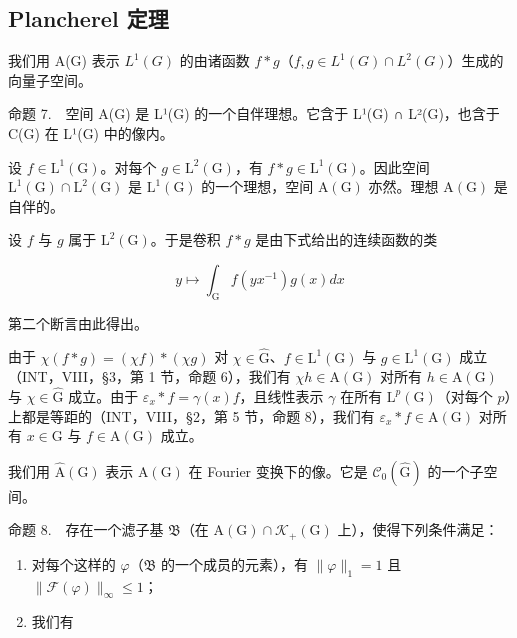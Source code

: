 \subsection{Plancherel 定理}

我们用 A(G) 表示 \(L^{1}(G)\) 的由诸函数 \(f * g\)（\(f, g \in L^{1}(G) \cap L^{2}(G)\)）生成的向量子空间。

命题 7.　空间 A(G) 是 L¹(G) 的一个自伴理想。它含于 L¹(G) ∩ L²(G)，也含于 C(G) 在 L¹(G) 中的像内。

设 \(f \in \mathrm{L}^1(\mathrm{G})\)。对每个 \(g \in \mathrm{L}^2(\mathrm{G})\)，有 \(f * g \in \mathrm{L}^1(\mathrm{G})\)。因此空间 \(\mathrm{L}^1(\mathrm{G}) \cap \mathrm{L}^2(\mathrm{G})\) 是 \(\mathrm{L}^1(\mathrm{G})\) 的一个理想，空间 \(\mathrm{A}(\mathrm{G})\) 亦然。理想 \(\mathrm{A}(\mathrm{G})\) 是自伴的。

设 \(f\) 与 \(g\) 属于 \(\mathrm{L}^2(\mathrm{G})\)。于是卷积 \(f * g\) 是由下式给出的连续函数的类

\[
y \mapsto \int_ {\mathrm{G}} f (y x ^ {- 1}) g (x) d x
\]

第二个断言由此得出。

由于 \(\chi(f*g) = (\chi f)*( \chi g)\) 对 \(\chi \in \widehat{\mathrm{G}}\)、\(f \in \mathrm{L}^1(\mathrm{G})\) 与 \(g \in \mathrm{L}^1(\mathrm{G})\) 成立（INT，VIII，§3，第 1 节，命题 6），我们有 \(\chi h \in \mathrm{A}(\mathrm{G})\) 对所有 \(h \in \mathrm{A}(\mathrm{G})\) 与 \(\chi \in \widehat{\mathrm{G}}\) 成立。由于 \(\varepsilon_x * f = \gamma(x)f\)，且线性表示 \(\gamma\) 在所有 \(\mathrm{L}^p(\mathrm{G})\)（对每个 \(p\)）上都是等距的（INT，VIII，§2，第 5 节，命题 8），我们有 \(\varepsilon_x * f \in \mathrm{A}(\mathrm{G})\) 对所有 \(x \in \mathrm{G}\) 与 \(f \in \mathrm{A}(\mathrm{G})\) 成立。

我们用 \(\widehat{\mathrm{A}}(\mathrm{G})\) 表示 \(\mathrm{A}(\mathrm{G})\) 在 Fourier 变换下的像。它是 \(\mathcal{C}_0(\widehat{\mathrm{G}})\) 的一个子空间。

命题 8.　存在一个滤子基 \(\mathfrak{B}\)（在 \(\mathrm{A}(\mathrm{G}) \cap \mathcal{K}_{+}(\mathrm{G})\) 上），使得下列条件满足：

\begin{enumerate}
\def\labelenumi{(\roman{enumi})}
\item
  对每个这样的 \(\varphi\)（\(\mathfrak{B}\) 的一个成员的元素），有 \(\|\varphi\|_1 = 1\) 且 \(\|\mathcal{F}(\varphi)\|_{\infty} \leqslant 1\)；
\item
  我们有
\end{enumerate}

